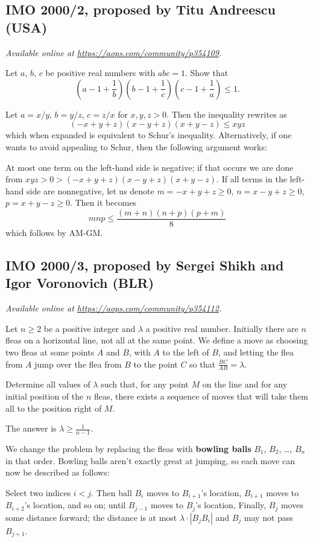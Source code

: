 \documentclass[11pt]{scrartcl}
\begin{document}
\subsection{IMO 2000/2, proposed by Titu Andreescu (USA)}
\textsl{Available online at \url{https://aops.com/community/p354109}.}
\begin{mdframed}[style=mdpurplebox,frametitle={Problem statement}]
Let $a$, $b$, $c$ be positive real numbers with $abc = 1$.
Show that
\[
  \left( a - 1 + \frac 1b \right)
  \left( b - 1 + \frac 1c \right)
  \left( c - 1 + \frac 1a \right)
  \le 1.
\]
\end{mdframed}
Let $a = x/y$, $b = y/z$, $c = z/x$ for $x,y,z > 0$.
Then the inequality rewrites as
\[ (-x+y+z)(x-y+z)(x+y-z) \le xyz \]
which when expanded is equivalent to Schur's inequality.
Alternatively, if one wants to avoid appealing to Schur,
then the following argument works:
\begin{itemize}
  \ii At most one term on the left-hand side is negative;
  if that occurs we are done from $xyz > 0 > (-x+y+z)(x-y+z)(x+y-z)$.
  \ii If all terms in the left-hand side are nonnegative,
  let us denote $m = -x+y+z \ge 0$, $n = x-y+z \ge 0$, $p = x+y-z \ge 0$.
  Then it becomes
  \[ mnp \le \frac{(m+n)(n+p)(p+m)}{8} \]
  which follows by AM-GM.
\end{itemize}
\pagebreak

\subsection{IMO 2000/3, proposed by Sergei Shikh and Igor Voronovich (BLR)}
\textsl{Available online at \url{https://aops.com/community/p354112}.}
\begin{mdframed}[style=mdpurplebox,frametitle={Problem statement}]
Let $n \ge 2$ be a positive integer
and $\lambda$ a positive real number.
Initially there are $n$ fleas on a horizontal line,
not all at the same point.
We define a move as choosing two fleas at some points $A$ and $B$,
with $A$ to the left of $B$,
and letting the flea from $A$ jump over the flea from $B$ to the point $C$
so that $\frac{BC}{AB} = \lambda$.

Determine all values of $ \lambda$ such that,
for any point $M$ on the line
and for any initial position of the $n$ fleas,
there exists a sequence of moves that will take
them all to the position right of $M$.
\end{mdframed}
The answer is $\lambda \ge \frac{1}{n-1}$.

We change the problem by replacing the fleas
with \textbf{bowling balls} $B_1$, $B_2$, \dots, $B_n$ in that order.
Bowling balls aren't exactly great at jumping,
so each move can now be described as follows:
\begin{itemize}
\ii Select two indices $i < j$.
Then ball $B_i$ moves to $B_{i+1}$'s location,
$B_{i+1}$ moves to $B_{i+2}$'s location, and so on;
until $B_{j-1}$ moves to $B_j$'s location,
\ii Finally, $B_j$ moves some distance forward;
the distance is at most $\lambda \cdot |B_j B_i|$
and $B_j$ may not pass $B_{j+1}$.
\end{itemize}
\end{document}
